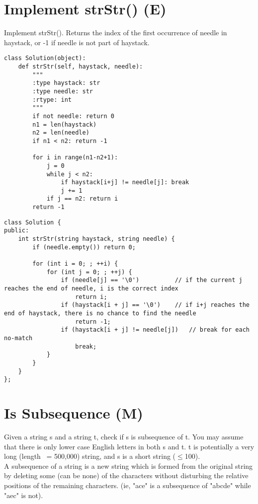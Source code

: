 \section{Implement strStr() (E)}
Implement strStr(). Returns the index of the first occurrence of needle in haystack, or -1 if needle is not part of haystack. \\

\begin{lstlisting}
class Solution(object):
    def strStr(self, haystack, needle):
        """
        :type haystack: str
        :type needle: str
        :rtype: int
        """
        if not needle: return 0
        n1 = len(haystack)
        n2 = len(needle)
        if n1 < n2: return -1
        
        for i in range(n1-n2+1):
            j = 0
            while j < n2:
                if haystack[i+j] != needle[j]: break
                j += 1
            if j == n2: return i
        return -1
\end{lstlisting}

\begin{lstlisting}
class Solution {
public:
    int strStr(string haystack, string needle) {
        if (needle.empty()) return 0;

        for (int i = 0; ; ++i) {
            for (int j = 0; ; ++j) {
                if (needle[j] == '\0')          // if the current j reaches the end of needle, i is the correct index
                    return i;
                if (haystack[i + j] == '\0')    // if i+j reaches the end of haystack, there is no chance to find the needle
                    return -1;
                if (haystack[i + j] != needle[j])   // break for each no-match
                    break;
            }
        }
    }
};
\end{lstlisting}


\section{Is Subsequence (M)}
Given a string s and a string t, check if s is subsequence of t. You may assume that there is only lower case English letters in both s and t. t is potentially a very long (length ~= 500,000) string, and s is a short string ($\leq$100).\\

A subsequence of a string is a new string which is formed from the original string by deleting some (can be none) of the characters without disturbing the relative positions of the remaining characters. (ie, "ace" is a subsequence of "abcde" while "aec" is not).\\

